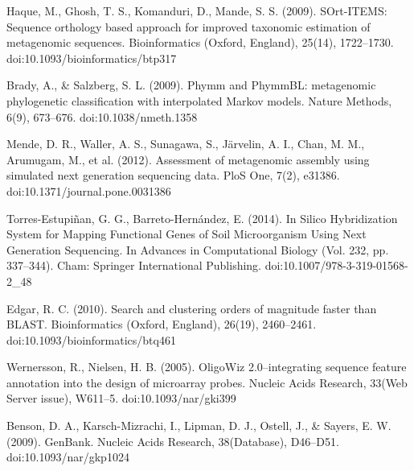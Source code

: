 \documentclass[10pt,letterpaper]{article}
\begin{document}
\begin{thebibliography}{10}
Haque, M., Ghosh, T. S., Komanduri, D., Mande, S. S. (2009). SOrt-ITEMS: Sequence orthology based approach for improved taxonomic estimation of metagenomic sequences. Bioinformatics (Oxford, England), 25(14), 1722–1730. doi:10.1093/bioinformatics/btp317

Brady, A., \& Salzberg, S. L. (2009). Phymm and PhymmBL: metagenomic phylogenetic classification with interpolated Markov models. Nature Methods, 6(9), 673–676. doi:10.1038/nmeth.1358

Mende, D. R., Waller, A. S., Sunagawa, S., Järvelin, A. I., Chan, M. M., Arumugam, M., et al. (2012). Assessment of metagenomic assembly using simulated next generation sequencing data. PloS One, 7(2), e31386. doi:10.1371/journal.pone.0031386

Torres-Estupiñan, G. G., Barreto-Hernández, E. (2014). In Silico Hybridization System for Mapping Functional Genes of Soil Microorganism Using Next Generation Sequencing. In Advances in Computational Biology (Vol. 232, pp. 337–344). Cham: Springer International Publishing. doi:10.1007/978-3-319-01568-2\_48

Edgar, R. C. (2010). Search and clustering orders of magnitude faster than BLAST. Bioinformatics (Oxford, England), 26(19), 2460–2461. doi:10.1093/bioinformatics/btq461

Wernersson, R., Nielsen, H. B. (2005). OligoWiz 2.0--integrating sequence feature annotation into the design of microarray probes. Nucleic Acids Research, 33(Web Server issue), W611–5. doi:10.1093/nar/gki399

Benson, D. A., Karsch-Mizrachi, I., Lipman, D. J., Ostell, J., \& Sayers, E. W. (2009). GenBank. Nucleic Acids Research, 38(Database), D46–D51. doi:10.1093/nar/gkp1024


\end{thebibliography}
\end{document}
